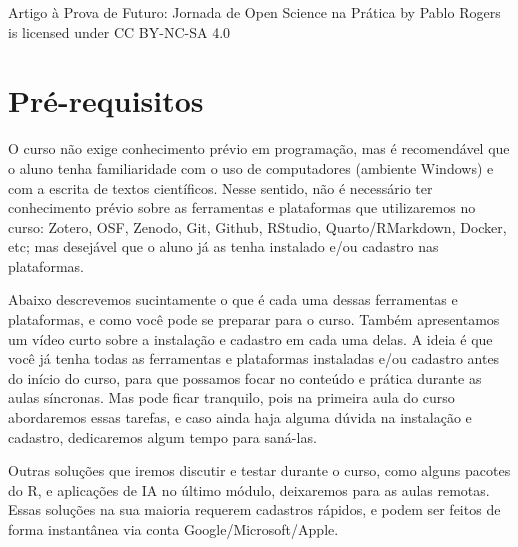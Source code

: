 \documentclass[
  a4paper,
]{book}
\begin{document}

Artigo à Prova de Futuro: Jornada de Open Science na Prática by Pablo
Rogers is licensed under CC BY-NC-SA 4.0


\chapter*{Pré-requisitos 📇}\label{sec-prework}


O curso não exige conhecimento prévio em programação, mas é recomendável
que o aluno tenha familiaridade com o uso de computadores (ambiente
Windows) e com a escrita de textos científicos. Nesse sentido, não é
necessário ter conhecimento prévio sobre as ferramentas e plataformas
que utilizaremos no curso: Zotero, OSF, Zenodo, Git, Github, RStudio,
Quarto/RMarkdown, Docker, etc; mas desejável que o aluno já as tenha
instalado e/ou cadastro nas plataformas.

Abaixo descrevemos sucintamente o que é cada uma dessas ferramentas e
plataformas, e como você pode se preparar para o curso. Também
apresentamos um vídeo curto sobre a instalação e cadastro em cada uma
delas. A ideia é que você já tenha todas as ferramentas e plataformas
instaladas e/ou cadastro antes do início do curso, para que possamos
focar no conteúdo e prática durante as aulas síncronas. Mas pode ficar
tranquilo, pois na primeira aula do curso abordaremos essas tarefas, e
caso ainda haja alguma dúvida na instalação e cadastro, dedicaremos
algum tempo para saná-las.

Outras soluções que iremos discutir e testar durante o curso, como
alguns pacotes do R, e aplicações de IA no último módulo, deixaremos
para as aulas remotas. Essas soluções na sua maioria requerem cadastros
rápidos, e podem ser feitos de forma instantânea via conta
Google/Microsoft/Apple.
\end{document}
